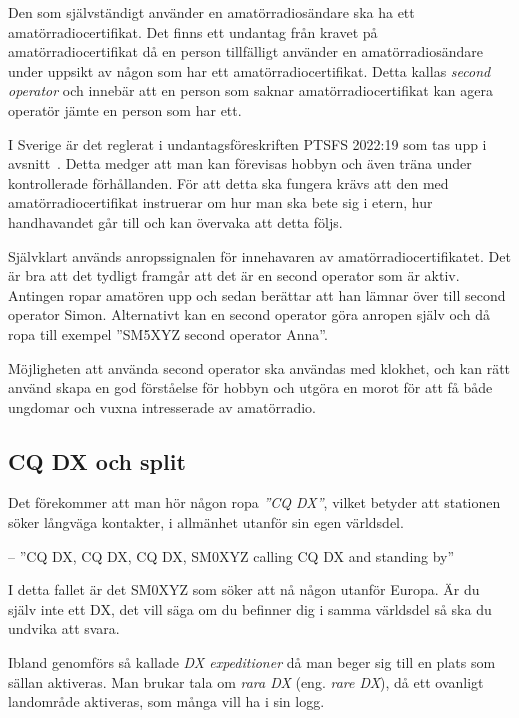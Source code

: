Den som självständigt använder en amatörradiosändare ska ha ett
amatörradiocertifikat.
Det finns ett undantag från kravet på amatörradiocertifikat då en person
tillfälligt använder en amatörradiosändare under uppsikt av någon som har ett
amatörradiocertifikat.
Detta kallas \emph{second operator} och innebär att en person som saknar
amatörradiocertifikat kan agera operatör jämte en person som har ett.

I Sverige är det reglerat i undantagsföreskriften PTSFS 2022:19 som tas upp i
avsnitt~.
Detta medger att man kan förevisas hobbyn och även träna under kontrollerade
förhållanden.
För att detta ska fungera krävs att den med amatörradiocertifikat instruerar
om hur man ska bete sig i etern, hur handhavandet går till och kan övervaka
att detta följs.

Självklart används anropssignalen för innehavaren av amatörradiocertifikatet.
Det är bra att det tydligt framgår att det är en second operator som är aktiv.
Antingen ropar amatören upp och sedan berättar att han lämnar över till second
operator Simon.
Alternativt kan en second operator göra anropen själv och då ropa till exempel
''SM5XYZ second operator Anna''.

Möjligheten att använda second operator ska användas med klokhet, och kan rätt
använd skapa en god förståelse för hobbyn och utgöra en morot för att få både
ungdomar och vuxna intresserade av amatörradio.

\subsection{CQ DX och split}
\label{cq dx och split}

Det förekommer att man hör någon ropa \emph{''CQ DX''}, vilket betyder att
stationen söker långväga kontakter, i allmänhet utanför sin egen världsdel.

-- ''CQ DX, CQ DX, CQ DX, SM0XYZ calling CQ DX and standing by''

I detta fallet är det SM0XYZ som söker att nå någon utanför Europa.
Är du själv inte ett DX, det vill säga om du befinner dig i samma världsdel så
ska du undvika att svara.

Ibland genomförs så kallade \emph{DX expeditioner} då man beger sig till en
plats som sällan aktiveras.
Man brukar tala om \emph{rara DX} (eng. \emph{rare DX}), då ett ovanligt
landområde aktiveras, som många vill ha i sin logg.

